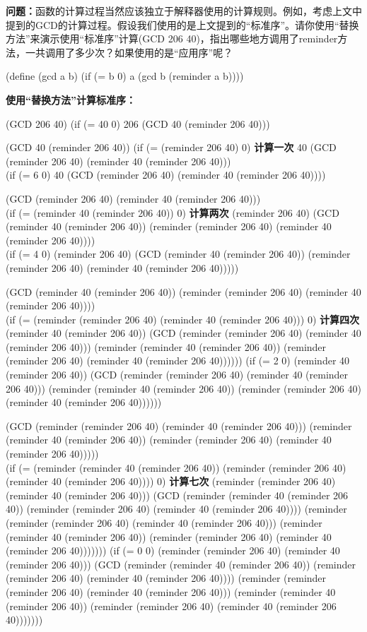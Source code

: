\documentclass{article}
\begin{document}
\begin{CJK}{UTF8}{gkai}
\textbf{问题：}函数的计算过程当然应该独立于解释器使用的计算规则。例如，考虑上文中提到的GCD的计算过程。假设我们使用的是上文提到的“标准序”。请你使用“替换方法”来演示使用“标准序”计算(GCD 206 40)，指出哪些地方调用了reminder方法，一共调用了多少次？如果使用的是“应用序”呢？

(define (gcd a b)
   (if (= b 0)
       a
       (gcd b (reminder a b))))

\textbf{使用“替换方法”计算标准序：}

(GCD 206 40)
(if (= 40 0)
     206
     (GCD 40 (reminder 206 40)))

(GCD 40 (reminder 206 40))
(if (= (reminder 206 40) 0) \textbf{计算一次} 
    40
    (GCD (reminder 206 40) (reminder 40 (reminder 206 40)))\\
(if (= 6 0)
    40
    (GCD (reminder 206 40) (reminder 40 (reminder 206 40))))

(GCD (reminder 206 40) (reminder 40 (reminder 206 40)))\\
(if (= (reminder 40 (reminder 206 40)) 0) \textbf{计算两次}
    (reminder 206 40)
    (GCD (reminder 40 (reminder 206 40)) (reminder (reminder 206 40) (reminder 40 (reminder 206 40))))\\
(if (= 4 0)
    (reminder 206 40)
    (GCD (reminder 40 (reminder 206 40)) (reminder (reminder 206 40) (reminder 40 (reminder 206 40)))))

(GCD (reminder 40 (reminder 206 40)) (reminder (reminder 206 40) (reminder 40 (reminder 206 40)))) \\
(if (= (reminder (reminder 206 40) (reminder 40 (reminder 206 40))) 0) \textbf{计算四次}
    (reminder 40 (reminder 206 40))
    (GCD (reminder (reminder 206 40) (reminder 40 (reminder 206 40))) (reminder (reminder 40 (reminder 206 40)) (reminder (reminder 206 40) (reminder 40 (reminder 206 40))))))
(if (= 2 0)
    (reminder 40 (reminder 206 40))
    (GCD (reminder (reminder 206 40) (reminder 40 (reminder 206 40))) (reminder (reminder 40 (reminder 206 40)) (reminder (reminder 206 40) (reminder 40 (reminder 206 40))))))

(GCD (reminder (reminder 206 40) (reminder 40 (reminder 206 40))) (reminder (reminder 40 (reminder 206 40)) (reminder (reminder 206 40) (reminder 40 (reminder 206 40)))))\\
(if (= (reminder (reminder 40 (reminder 206 40)) (reminder (reminder 206 40) (reminder 40 (reminder 206 40)))) 0) \textbf{计算七次}
    (reminder (reminder 206 40) (reminder 40 (reminder 206 40)))
    (GCD (reminder (reminder 40 (reminder 206 40)) (reminder (reminder 206 40) (reminder 40 (reminder 206 40)))) (reminder (reminder (reminder 206 40) (reminder 40 (reminder 206 40))) (reminder (reminder 40 (reminder 206 40)) (reminder (reminder 206 40) (reminder 40 (reminder 206 40)))))))
(if (= 0 0)
    (reminder (reminder 206 40) (reminder 40 (reminder 206 40)))
    (GCD (reminder (reminder 40 (reminder 206 40)) (reminder (reminder 206 40) (reminder 40 (reminder 206 40)))) (reminder (reminder (reminder 206 40) (reminder 40 (reminder 206 40))) (reminder (reminder 40 (reminder 206 40)) (reminder (reminder 206 40) (reminder 40 (reminder 206 40)))))))


\end{CJK}
\end{document}

